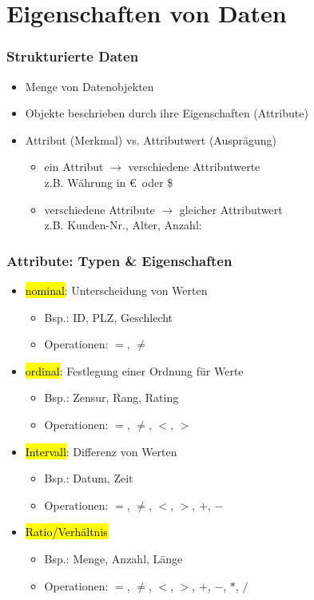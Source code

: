 
\section{Eigenschaften von Daten}


\begin{frame}
\frametitle{Strukturierte Daten}

\begin{itemize}
\item Menge von Datenobjekten
\item Objekte beschrieben durch ihre Eigenschaften (Attribute)
\item Attribut (Merkmal) vs. Attributwert (Ausprägung)
\begin{itemize}
\item ein Attribut $\longrightarrow$ verschiedene Attributwerte\\
z.B. Währung in \euro\ oder \$
\item verschiedene Attribute $\longrightarrow$ gleicher Attributwert\\
z.B. Kunden-Nr., Alter, Anzahl: 
\end{itemize}
\end{itemize}
\end{frame}


\begin{frame}
\frametitle{Attribute: Typen \& Eigenschaften}

\begin{itemize}
\item \hl{nominal}: Unterscheidung von Werten
\begin{itemize}
\item Bsp.: ID, PLZ, Geschlecht
\item Operationen: $=$, $\neq$
\end{itemize}
\item \hl{ordinal}: Festlegung einer Ordnung für Werte
\begin{itemize}
\item Bsp.: Zensur, Rang, Rating
\item Operationen: $=$, $\neq$, $<$, $>$
\end{itemize}
\item \hl{Intervall}: Differenz von Werten
\begin{itemize}
\item Bsp.: Datum, Zeit
\item Operationen: $=$, $\neq$, $<$, $>$, $+$, $-$
\end{itemize}
\item \hl{Ratio/Verhältnis}
\begin{itemize}
\item Bsp.: Menge, Anzahl, Länge
\item Operationen: $=$, $\neq$, $<$, $>$, $+$, $-$, $*$, $/$
\end{itemize}
\end{itemize}

\end{frame}


